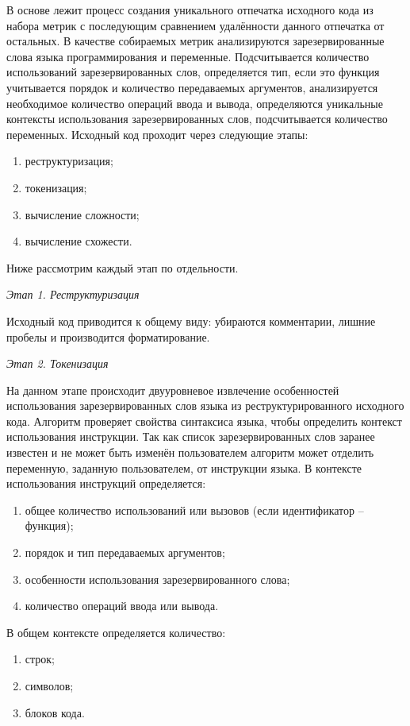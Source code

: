 В основе лежит процесс создания уникального отпечатка\cite{thesaurus} исходного кода из набора метрик с последующим сравнением удалённости данного отпечатка от остальных\cite{fingerprint-distance}. В качестве собираемых метрик анализируются зарезервированные слова языка программирования\cite{c-reserved-keywords} и переменные. Подсчитывается количество использований зарезервированных слов, определяется тип, если это функция учитывается порядок и количество передаваемых аргументов, анализируется необходимое количество операций ввода и вывода, определяются уникальные контексты использования зарезервированных слов, подсчитывается количество переменных. Исходный код проходит через следующие этапы:

\begin{enumerate}
	\item реструктуризация;
	\item токенизация;
	\item вычисление сложности;
	\item вычисление схожести.
\end{enumerate}

Ниже рассмотрим каждый этап по отдельности.

\noindent\textit{Этап 1. Реструктуризация}

Исходный код приводится к общему виду: убираются комментарии, лишние пробелы и производится форматирование.

\noindent\textit{Этап 2. Токенизация}

На данном этапе происходит двууровневое извлечение особенностей использования зарезервированных слов языка из реструктурированного исходного кода. Алгоритм проверяет свойства синтаксиса языка, чтобы определить контекст использования инструкции. Так как список зарезервированных слов заранее известен и не может быть изменён пользователем алгоритм может отделить переменную, заданную пользователем, от инструкции языка. В контексте использования инструкций определяется: 
\begin{enumerate}
	\item общее количество использований или вызовов (если идентификатор -- функция); 
	\item порядок и тип передаваемых аргументов;
	\item особенности использования зарезервированного слова;
	\item количество операций ввода или вывода. 
\end{enumerate}

В общем контексте определяется количество:
\begin{enumerate}
	\item строк;
	\item символов;
	\item блоков кода.
\end{enumerate}

